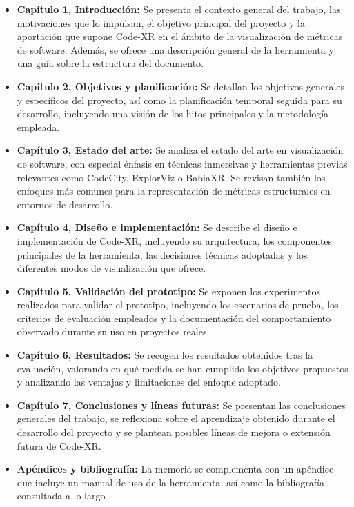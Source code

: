 \documentclass[a4paper, 12pt]{book}
\begin{document}
\begin{itemize}
    \item \textbf{Capítulo 1, Introducción:} Se presenta el contexto general del trabajo, las motivaciones que lo impulsan, el objetivo principal del proyecto y la aportación que supone Code-XR en el ámbito de la visualización de métricas de software. Además, se ofrece una descripción general de la herramienta y una guía sobre la estructura del documento.
    \item \textbf{Capítulo 2, Objetivos y planificación:} Se detallan los objetivos generales y específicos del proyecto, así como la planificación temporal seguida para su desarrollo, incluyendo una visión de los hitos principales y la metodología empleada.
    \item \textbf{Capítulo 3, Estado del arte:} Se analiza el estado del arte en visualización de software, con especial énfasis en técnicas inmersivas y herramientas previas relevantes como CodeCity, ExplorViz o BabiaXR. Se revisan también los enfoques más comunes para la representación de métricas estructurales en entornos de desarrollo.
    \item \textbf{Capítulo 4, Diseño e implementación:} Se describe el diseño e implementación de Code-XR, incluyendo su arquitectura, los componentes principales de la herramienta, las decisiones técnicas adoptadas y los diferentes modos de visualización que ofrece.
    \item \textbf{Capítulo 5, Validación del prototipo:} Se exponen los experimentos realizados para validar el prototipo, incluyendo los escenarios de prueba, los criterios de evaluación empleados y la documentación del comportamiento observado durante su uso en proyectos reales.
    \item \textbf{Capítulo 6, Resultados:} Se recogen los resultados obtenidos tras la evaluación, valorando en qué medida se han cumplido los objetivos propuestos y analizando las ventajas y limitaciones del enfoque adoptado.
    \item \textbf{Capítulo 7, Conclusiones y líneas futuras:} Se presentan las conclusiones generales del trabajo, se reflexiona sobre el aprendizaje obtenido durante el desarrollo del proyecto y se plantean posibles líneas de mejora o extensión futura de Code-XR.
    \item \textbf{Apéndices y bibliografía:} La memoria se complementa con un apéndice que incluye un manual de uso de la herramienta, así como la bibliografía consultada a lo largo
\end{itemize}
\end{document}
